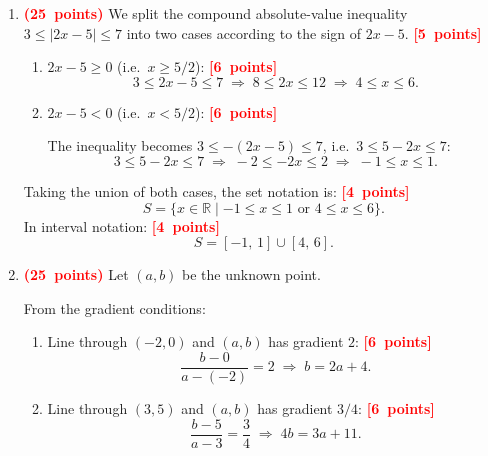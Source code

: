 \documentclass[12pt,a4paper]{article}
\newcommand{\R}{\mathbb{R}}
\newcommand{\bobot}[1]{\mbox{\textcolor{red}{\textbf{(#1 points)}}}}
\newcommand{\poin}[1]{\mbox{\textcolor{red}{\textbf{[#1 points]}}}}
\begin{document}
\begin{enumerate}

  \item \bobot{25} We split the compound absolute-value inequality $3 \le |2x-5| \le 7$
        into two cases according to the sign of $2x-5$. \poin{5}

        \begin{enumerate}
          \item $2x - 5 \ge 0$ (i.e.\ $x \ge 5/2$): \poin{6}
                \[
                  3 \le 2x - 5 \le 7
                  \;\Longrightarrow\;
                  8 \le 2x \le 12
                  \;\Longrightarrow\;
                  4 \le x \le 6.
                \]

          \item $2x - 5 < 0$ (i.e.\ $x < 5/2$): \poin{6}

                The inequality becomes $3 \le -(2x-5) \le 7$,
                i.e.\ $3 \le 5-2x \le 7$:
                \[
                  3 \le 5 - 2x \le 7
                  \;\Longrightarrow\;
                  -2 \le -2x \le 2
                  \;\Longrightarrow\;
                  -1 \le x \le 1.
                \]
        \end{enumerate}

        Taking the union of both cases, the set notation is: \poin{4}
        \[
          \boxed{S = \{x \in \R \mid -1 \le x \le 1 \text{ or } 4 \le x \le 6\}.}
        \]
        In interval notation: \poin{4}
        \[
          \boxed{S = [-1,\,1]\cup[4,\,6].}
        \]

  \item \bobot{25} Let $(a, b)$ be the unknown point.

        From the gradient conditions:
        \begin{enumerate}
          \item Line through $(-2, 0)$ and $(a, b)$ has gradient $2$: \poin{6}
                \[
                  \frac{b - 0}{a - (-2)} = 2
                  \;\Longrightarrow\;
                  b = 2a + 4. \tag{1}
                \]

          \item Line through $(3, 5)$ and $(a, b)$ has gradient $3/4$: \poin{6}
                \[
                  \frac{b - 5}{a - 3} = \frac{3}{4}
                  \;\Longrightarrow\;
                  4b = 3a + 11. \tag{2}
                \]
        \end{enumerate}


\end{enumerate}
\end{document}
